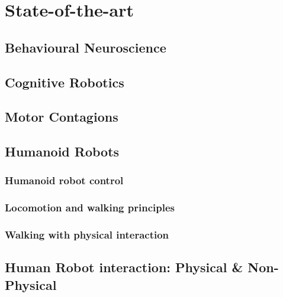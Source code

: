 \chapter{State-of-the-art}




\section{Behavioural Neuroscience}

\section{Cognitive Robotics}

\section{Motor Contagions}

\section{Humanoid Robots}
\subsection{Humanoid robot control}
\subsection{Locomotion and walking principles}
\subsection{Walking with physical interaction}


\section{Human Robot interaction: Physical \& Non-Physical}

